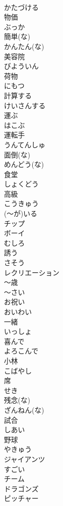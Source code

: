 \documentclass[8pt]{extreport}
\begin{document}
\begin{CJK}{UTF8}{min}
\\	かたづける
\\	物価	
\\	ぶっか
\\	簡単(な)	
\\	かんたん(な)
\\	美容院	
\\	びよういん
\\	荷物	
\\	にもつ
\\	計算する	
\\	けいさんする
\\	運ぶ	
\\	はこぶ
\\	運転手	
\\	うんてんしゅ
\\	面倒(な)	
\\	めんどう(な)
\\	食堂	
\\	しょくどう
\\	高級	
\\	こうきゅう
\\	(～が)いる	
\\	チップ	
\\	ボーイ	
\\	むしろ	
\\	誘う	
\\	さそう
\\	レクリエーション	
\\	～歳	
\\	～さい
\\	お祝い	
\\	おいわい
\\	一緒	
\\	いっしょ
\\	喜んで	
\\	よろこんで
\\	小林	
\\	こばやし
\\	席	
\\	せき
\\	残念(な)	
\\	ざんねん(な)
\\	試合	
\\	しあい
\\	野球	
\\	やきゅう
\\	ジャイアンツ	
\\	すごい	
\\	チーム	
\\	ドラゴンズ	
\\	ピッチャー	

\end{CJK}
\end{document}
